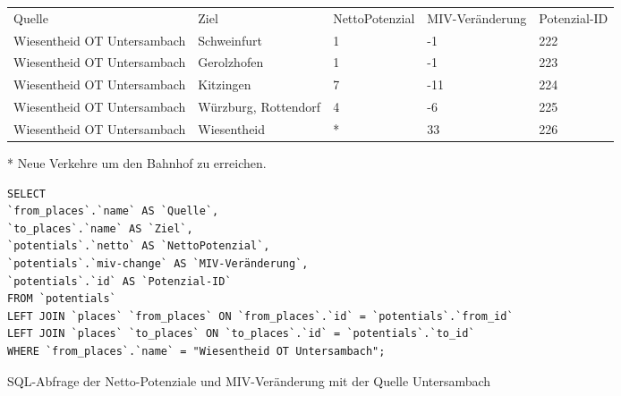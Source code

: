 \begin{tabular}{ l  l  l  l  l }
Quelle & Ziel & NettoPotenzial & MIV-Veränderung & Potenzial-ID\\ 
Wiesentheid OT Untersambach & Schweinfurt & 1 & -1 & 222\\ 
Wiesentheid OT Untersambach & Gerolzhofen & 1 & -1 & 223\\ 
Wiesentheid OT Untersambach & Kitzingen & 7 & -11 & 224\\ 
Wiesentheid OT Untersambach & Würzburg, Rottendorf & 4 & -6 & 225\\ 
Wiesentheid OT Untersambach & Wiesentheid & * & 33 & 226\\ 
\end{tabular}
\newline
\newline
* Neue Verkehre um den Bahnhof zu erreichen.
\newline
\begin{listing}[htbp]
\begin{verbatim}
SELECT
`from_places`.`name` AS `Quelle`, 
`to_places`.`name` AS `Ziel`, 
`potentials`.`netto` AS `NettoPotenzial`, 
`potentials`.`miv-change` AS `MIV-Veränderung`, 
`potentials`.`id` AS `Potenzial-ID`
FROM `potentials`
LEFT JOIN `places` `from_places` ON `from_places`.`id` = `potentials`.`from_id`
LEFT JOIN `places` `to_places` ON `to_places`.`id` = `potentials`.`to_id`
WHERE `from_places`.`name` = "Wiesentheid OT Untersambach";
\end{verbatim}
\caption{SQL-Abfrage der Netto-Potenziale und MIV-Veränderung mit der Quelle Untersambach}\label{lst-fz-untersambach}
\end{listing}